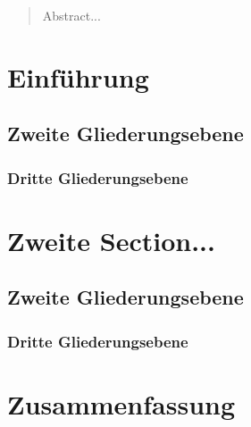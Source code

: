 \documentclass[a4paper, 12pt, DIV=11, listof=numbered, numbers=noenddot]{scrartcl}
\begin{document}
	
	
	\newpage
	
	\maketitle
	
	\begin{abstract}
		Abstract...

	\end{abstract}
	
	\section{Einführung}
		
	\subsection{Zweite Gliederungsebene}
	
	\subsubsection{Dritte Gliederungsebene}
		
	\section{Zweite Section...}
		
	\subsection{Zweite Gliederungsebene}

	\subsubsection{Dritte Gliederungsebene}
	
	\section{Zusammenfassung}
	
	
	\newpage
	
	
\end{document}
